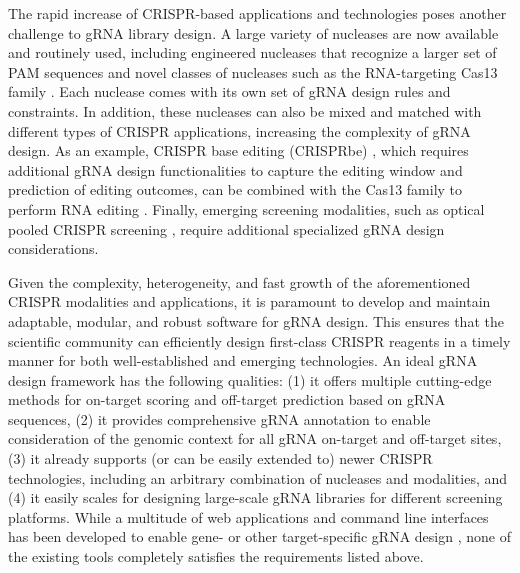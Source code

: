 \documentclass[pdftex,english,10pt]{article}
\begin{document}
The rapid increase of CRISPR-based applications and technologies poses another challenge to gRNA library design.
A large variety of nucleases are now available and routinely used, including engineered nucleases that recognize a larger set of PAM sequences  \citep{xcas9,spcas9ng, spg, enpamgb} and novel classes of nucleases such as the RNA-targeting Cas13 family \citep{c2c2_1, c2c2_2,cas13d}. Each nuclease comes with its own set of gRNA design rules and constraints. In addition, these nucleases can also be mixed and matched with different types of CRISPR applications, increasing the complexity of gRNA design. As an example, CRISPR base editing (CRISPRbe) \citep{gaudelli,komor}, which requires additional gRNA design functionalities to capture the editing window and prediction of editing outcomes, can be combined with the Cas13 family to perform RNA editing \citep{rnaediting1}. Finally, emerging screening modalities, such as optical pooled CRISPR screening \citep{ops}, require additional specialized gRNA design considerations. 


Given the complexity, heterogeneity, and fast growth of the aforementioned CRISPR modalities and applications, it is paramount to develop and maintain adaptable, modular, and robust software for gRNA design. This ensures that the scientific community can efficiently design first-class CRISPR reagents in a timely manner for both well-established and emerging technologies. An ideal gRNA design framework has the following qualities: (1) it offers multiple cutting-edge methods for on-target scoring and off-target prediction based on gRNA sequences, (2) it provides comprehensive gRNA annotation to enable consideration of the genomic context for all gRNA on-target and off-target sites, (3) it already supports (or can be easily extended to) newer CRISPR technologies, including an arbitrary combination of nucleases and modalities, and (4) it easily scales for designing large-scale gRNA libraries for different screening platforms. While a multitude of web applications and command line interfaces has been developed to enable gene- or other target-specific gRNA design \citep{ecrisp,crisprscan,guidescan,casoffinder, chopchop, crispor, cctop, flashfry,cld,multicrispr, crisprseek}, none of the existing tools completely satisfies the requirements listed above.
\end{document}
